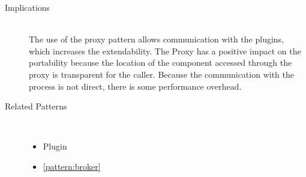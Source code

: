\begin{description}
\item [Implications]~\\
The use of the {proxy} pattern allows communication with the plugins, which increases the extendability. 
The Proxy has a positive impact on the portability because the location of the component accessed through the proxy is transparent for the caller.
Because the communication with the process is not direct, there is some performance overhead.

\item [Related Patterns]~
\begin{itemize}
\item Plugin
\item \ref{pattern:broker}
\end{itemize}

\end{description}

